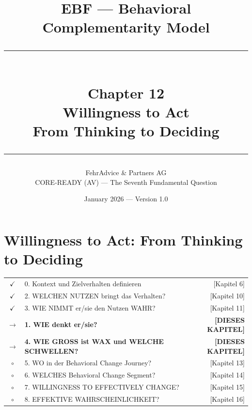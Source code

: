 \documentclass[11pt,a4paper]{book}
\title{
    \vspace{-2cm}
    {\Large EBF — Behavioral Complementarity Model}\\[0.5cm]
    \rule{\textwidth}{1pt}\\[0.5cm]
    {\Huge\bfseries Chapter 12}\\[0.3cm]
    {\LARGE Willingness to Act}\\[0.2cm]
    {\large From Thinking to Deciding}\\[0.5cm]
    \rule{\textwidth}{1pt}
}
\author{
    FehrAdvice \& Partners AG\\[0.2cm]
    \small CORE-READY (AV) — The Seventh Fundamental Question
}
\date{January 2026 — Version 1.0}
\theoremstyle{definition}
\theoremstyle{remark}
\begin{document}
\maketitle
\thispagestyle{empty}

\tableofcontents
\newpage

\chapter{Willingness to Act: From Thinking to Deciding}
\label{ch:willingness}

\begin{tcolorbox}[
  title={\textbf{Die 9 Fragen des EBF — Kapitelnavigation}},
  colback=blue!3,
  colframe=blue!50!black,
  fonttitle=\bfseries\sffamily,
  coltitle=white,
  boxrule=0.8pt,
  arc=2mm
]
\small\sffamily
\begin{tabular}{@{}clr@{}}
$\checkmark$ & 0. Kontext und Zielverhalten definieren & [Kapitel 6] \\
$\checkmark$ & 2. WELCHEN NUTZEN bringt das Verhalten? & [Kapitel 10] \\
$\checkmark$ & 3. WIE NIMMT er/sie den Nutzen WAHR? & [Kapitel 11] \\
$\rightarrow$ & \textbf{1. WIE denkt er/sie?} & \textbf{[DIESES KAPITEL]} \\
$\rightarrow$ & \textbf{4. WIE GROSS ist WAX und WELCHE SCHWELLEN?} & \textbf{[DIESES KAPITEL]} \\
$\circ$ & 5. WO in der Behavioral Change Journey? & [Kapitel 13] \\
$\circ$ & 6. WELCHES Behavioral Change Segment? & [Kapitel 14] \\
$\circ$ & 7. WILLINGNESS TO EFFECTIVELY CHANGE? & [Kapitel 15] \\
$\circ$ & 8. EFFEKTIVE WAHRSCHEINLICHKEIT? & [Kapitel 16] \\
\end{tabular}
\end{tcolorbox}

\vspace{1cm}
\end{document}
